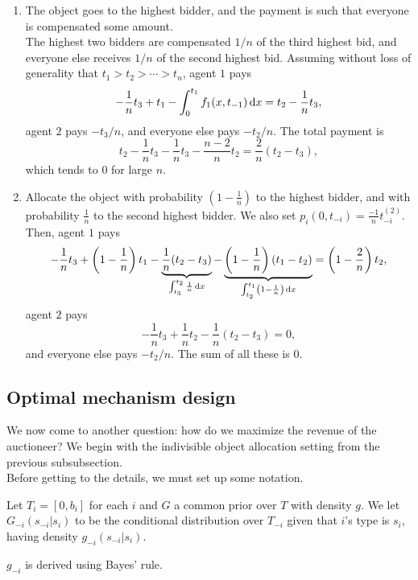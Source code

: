 		\begin{fex}
			\phantom{pain}
			\begin{enumerate}
				\item The object goes to the highest bidder, and the payment is such that everyone is compensated some amount.\\
				The highest two bidders are compensated $1/n$ of the third highest bid, and everyone else receives $1/n$ of the second highest bid. Assuming without loss of generality that $t_1 > t_2 > \cdots > t_n$, agent $1$ pays
				\[ -\frac{1}{n}t_3 + t_1 - \int_0^{t_1} f_1(x,t_{-1}) \dif x = t_2 - \frac{1}{n} t_3, \]
				agent $2$ pays $-t_3/n$, and everyone else pays $-t_2/n$. The total payment is
				\[ t_2 - \frac{1}{n}t_3 - \frac{1}{n}t_3 - \frac{n-2}{n} t_2 = \frac{2}{n}(t_2 - t_3), \]
				which tends to $0$ for large $n$.

				\item Allocate the object with probability $\left(1 - \frac{1}{n}\right)$ to the highest bidder, and with probability $\frac{1}{n}$ to the second highest bidder. We also set $p_i(0,t_{-i}) = \frac{-1}{n} t_{-i}^{(2)}$. Then, agent $1$ pays
				\[ -\frac{1}{n}t_3 + \left( 1 - \frac{1}{n} \right)t_1 - \underbrace{\frac{1}{n}(t_2-t_3)}_{\int_{t_3}^{t_2} \frac{1}{n} \dif x } - \underbrace{\left(1 - \frac{1}{n}\right)(t_1-t_2)}_{\int_{t_2}^{t_1} \left(1-\frac{1}{n}\right) \dif x } = \left( 1 - \frac{2}{n} \right)t_2, \]
				agent $2$ pays
				\[ -\frac{1}{n}t_3 + \frac{1}{n}t_2 - \frac{1}{n}(t_2-t_3) = 0, \]
				and everyone else pays $-t_2/n$. The sum of all these is $0$.
			\end{enumerate}
		\end{fex}

	\subsection{Optimal mechanism design}

		We now come to another question: how do we maximize the revenue of the auctioneer? We begin with the indivisible object allocation setting from the previous subsubsection. \\
		Before getting to the details, we must set up some notation.

		\begin{fdef}
			Let $T_i = [0,b_i]$ for each $i$ and $G$ a common prior over $T$ with density $g$. We let $G_{-i}(s_{-i} | s_i)$ to be the conditional distribution over $T_{-i}$ given that $i$'s type is $s_i$, having density $g_{-i}(s_{-i}| s_i)$.
		\end{fdef}
		$g_{-i}$ is derived using Bayes' rule.

